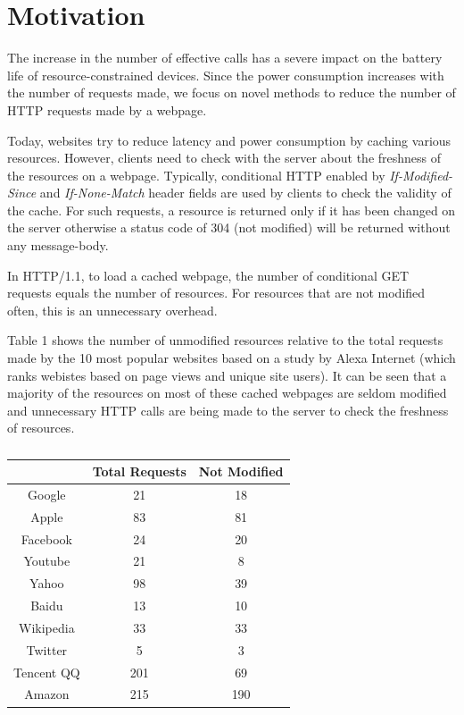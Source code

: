 \documentclass{sigplanconf}
\begin{document}
\section{Motivation}
The increase in the number of effective calls has a severe impact on the battery life of resource-constrained devices. Since the power consumption increases with the number of requests made, we focus on novel methods to reduce the number of HTTP requests made by a webpage.

Today, websites try to reduce latency and power consumption by caching various resources. However, clients need to check with the server about the freshness of the resources on a webpage. Typically, conditional HTTP enabled by {\it If-Modified-Since} and {\it If-None-Match} header fields are used by clients to check the validity of the cache. For such requests, a resource is returned only if it has been changed on the server otherwise a status code of 304 (not modified) will be returned without any message-body. 

In HTTP/1.1, to load a cached webpage, the number of conditional GET requests equals the number of resources. For resources that are not modified often, this is an unnecessary overhead.

Table 1 shows the number of unmodified resources relative to the total requests made by the 10 most popular websites based on a study by Alexa Internet (which ranks webistes based on page views and unique site users). It can be seen that a majority of the resources on most of these cached webpages are seldom modified and unnecessary HTTP calls are being made to the server to check the freshness of resources.

\begin{table}[htbp]
\centering
\caption{}
\begin{tabular}{|c|c|c|}
\hline
 & \multicolumn{1}{l|}{Total Requests} & \multicolumn{1}{l|}{Not Modified} \\ \hline
Google & 21 & 18 \\ \hline
Apple & 83 & 81 \\ \hline
Facebook & 24 & 20 \\ \hline
Youtube & 21 & 8 \\ \hline
Yahoo & 98 & 39 \\ \hline
Baidu & 13 & 10 \\ \hline
Wikipedia & 33 & 33 \\ \hline
Twitter & 5 & 3 \\ \hline
Tencent QQ & 201 & 69 \\ \hline
Amazon & 215 & 190 \\ \hline
\end{tabular}
\label{}
\end{table}
\end{document}
